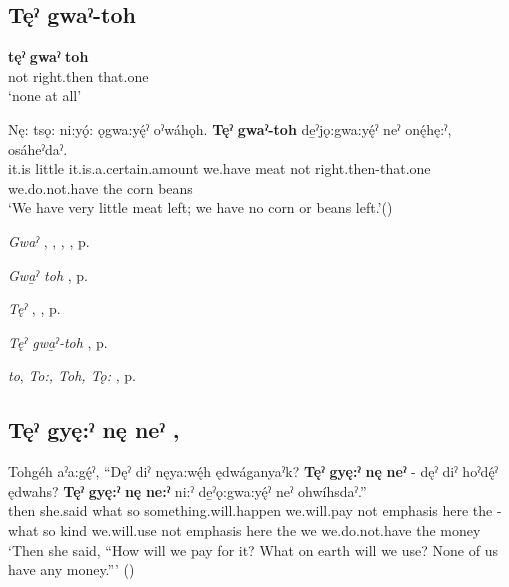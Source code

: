 \subsection*{\textbf{Tęˀ gwaˀ-toh} } \label{p:tęˀ gwa̱ˀ-toh}

\ea
\label{ex:tpart31}
\gll \textbf{tęˀ} \textbf{gwaˀ} \textbf{toh}\\
not right.then that.one\\
\glt ‘none at all’
\z

\ea
\label{ex:tpart32}
\gll Nę: tsǫ: ni:yǫ́: ǫgwa:yę́ˀ oˀwáhǫh. \textbf{Tęˀ} \textbf{gwaˀ-toh} de̱ˀjǫ:gwa:yę́ˀ neˀ onę́hę:ˀ, osáheˀdaˀ.\\
it.is little it.is.a.certain.amount we.have meat not right.then-that.one we.do.not.have the corn beans\\
\glt ‘We have very little meat left; we have no corn or beans left.’(\cite{carrier_legends_2013})
\z

\begin{CayugaRelated}
\item \textit{Gwaˀ} , , , , p. \pageref{p:[gwaˀ] ‘immediately’}\\
\item \textit{Gwa̱ˀ toh} , p. \pageref{p:[gwaˀ toh]}\\
\item \textit{Tęˀ} , , p. \pageref{p:[tęˀ]}\\
\item \textit{Tęˀ gwa̱ˀ-toh} , p. \pageref{p:tęˀ gwa̱ˀ-toh}\\
\item \textit{to}, \textit{To:, Toh, Tǫ:} , p. \pageref{p:[to:] ‘that one’}
\end{CayugaRelated}

\subsection*{\textbf{Tęˀ gyę:ˀ nę neˀ} , } \label{p:[tęˀ gyę:ˀ nę neˀ]}

\ea
\label{ex:tpart41}
\gll Tohgéh aˀa:gę́ˀ, “Dęˀ diˀ nęya:wę́h ędwáganyaˀk? \textbf{Tęˀ} \textbf{gyę:ˀ} \textbf{nę} \textbf{neˀ} - dęˀ diˀ hoˀdę́ˀ ędwahs? \textbf{Tęˀ} \textbf{gyę:ˀ} \textbf{nę} \textbf{ne:ˀ} ni:ˀ de̱ˀǫ:gwa:yę́ˀ neˀ ohwíhsdaˀ.”\\
then she.said what so something.will.happen we.will.pay not emphasis here the - what so kind we.will.use not emphasis here the we we.do.not.have the money\\
\glt ‘Then she said, “How will we pay for it? What on earth will we use? None of us have any money.”’ (\cite{henry_de_2005})
\z

